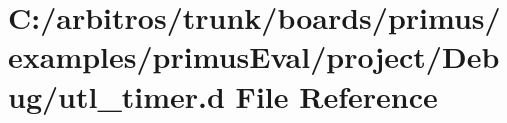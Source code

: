 \hypertarget{boards_2primus_2examples_2primus_eval_2project_2_debug_2utl__timer_8d}{\section{C\-:/arbitros/trunk/boards/primus/examples/primus\-Eval/project/\-Debug/utl\-\_\-timer.d File Reference}
\label{boards_2primus_2examples_2primus_eval_2project_2_debug_2utl__timer_8d}
}
